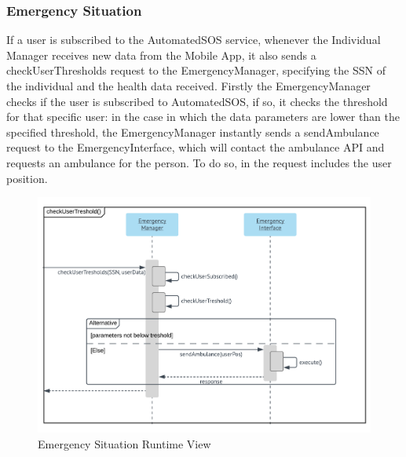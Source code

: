 \subsubsection{Emergency Situation}
If a user is subscribed to the AutomatedSOS service, whenever the Individual Manager receives new data from the Mobile App, it also sends a checkUserThresholds request to the EmergencyManager, specifying the SSN of the individual and the health data received. Firstly the EmergencyManager checks if the user is subscribed to AutomatedSOS, if so, it checks the threshold for that specific user: in the case in which the data parameters are lower than the specified threshold, the EmergencyManager instantly sends a sendAmbulance request to the EmergencyInterface, which will contact the ambulance API and requests an ambulance for the person. To do so, in the request includes the user position. 
\begin{figure}[H]
	\includegraphics[width=\textwidth,height=\textheight,keepaspectratio]{assets/flowCharts/EmergencySituation.pdf}
	\caption{Emergency Situation Runtime View}
	\label{fig:EmergencySituation}
\end{figure}


